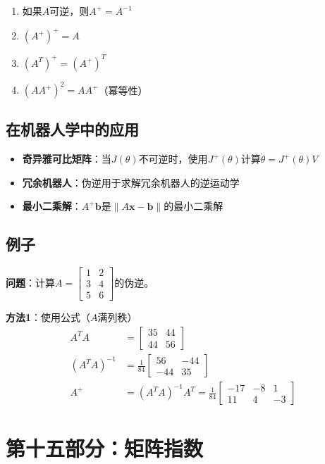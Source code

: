 \documentclass[12pt,a4paper]{article}
\begin{document}
\begin{enumerate}
\item 如果$A$可逆，则$A^+ = A^{-1}$
\item $(A^+)^+ = A$
\item $(A^T)^+ = (A^+)^T$
\item $(AA^+)^2 = AA^+$（幂等性）
\end{enumerate}

\subsection{在机器人学中的应用}

\begin{itemize}
\item \textbf{奇异雅可比矩阵}：当$J(\theta)$不可逆时，使用$J^+(\theta)$计算$\dot{\theta} = J^+(\theta) V$
\item \textbf{冗余机器人}：伪逆用于求解冗余机器人的逆运动学
\item \textbf{最小二乘解}：$A^+ \bm{b}$是$\|A\bm{x} - \bm{b}\|$的最小二乘解
\end{itemize}

\subsection{例子}

\textbf{问题}：计算$A = \begin{bmatrix} 1 & 2 \\ 3 & 4 \\ 5 & 6 \end{bmatrix}$的伪逆。

\textbf{方法1}：使用公式（$A$满列秩）
\begin{align}
A^T A &= \begin{bmatrix} 35 & 44 \\ 44 & 56 \end{bmatrix} \\
(A^T A)^{-1} &= \frac{1}{84} \begin{bmatrix} 56 & -44 \\ -44 & 35 \end{bmatrix} \\
A^+ &= (A^T A)^{-1} A^T = \frac{1}{84} \begin{bmatrix} -17 & -8 & 1 \\ 11 & 4 & -3 \end{bmatrix}
\end{align}

\section{第十五部分：矩阵指数}
\end{document}
